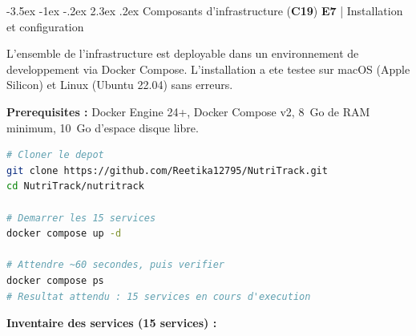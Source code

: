 \documentclass[a4paper,11pt,oneside,openany]{report}
\makeatletter
\renewcommand\section{\@startsection{section}{1}{\z@}%
  {-3.5ex \@plus -1ex \@minus -.2ex}%
  {2.3ex \@plus.2ex}%
  {\normalfont\Large\bfseries\color{ntgreen}}}
\newcommand{\competence}[1]{\textbf{\textcolor{ntgreen}{#1}}}
\newcommand{\evaluation}[1]{\textbf{\textcolor{ntblue}{#1}}}
\makeatother
\begin{document}
\section{Composants d'infrastructure (\competence{C19})}
\label{sec:c19}
{\small\evaluation{E7} | Installation et configuration}

L'ensemble de l'infrastructure est deployable dans un environnement de
developpement via Docker Compose. L'installation a ete testee sur macOS
(Apple Silicon) et Linux (Ubuntu 22.04) sans erreurs.

\textbf{Prerequisites :} Docker Engine 24+, Docker Compose v2, 8~Go de RAM
minimum, 10~Go d'espace disque libre.

\begin{lstlisting}[language=bash, caption={Deploiement de l'infrastructure}]
# Cloner le depot
git clone https://github.com/Reetika12795/NutriTrack.git
cd NutriTrack/nutritrack

# Demarrer les 15 services
docker compose up -d

# Attendre ~60 secondes, puis verifier
docker compose ps
# Resultat attendu : 15 services en cours d'execution
\end{lstlisting}

\textbf{Inventaire des services (15 services) :}
\end{document}
